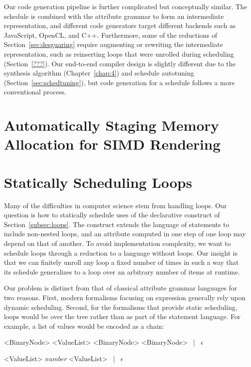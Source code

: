 Our code generation pipeline is further complicated but conceptually similar. The schedule is combined with the attribute grammar to form an intermediate representation, and different code generators target different backends such as JavaScript, OpenCL, and C++. Furthermore, some of the reductions of Section~\ref{sec:desguaring} require augmenting or rewriting the intermediate representation, such as reinserting loops that were unrolled during scheduling (Section~\ref{???}). Our end-to-end compiler design is slightly different due to the synthesis algorithm (Chapter~\ref{chap:4})  and schedule autotuning (Section~\ref{sec:schedtuning}), but code generation for a schedule follows a more conventional process.


\section{Automatically Staging Memory Allocation for SIMD Rendering}




\section{Statically Scheduling Loops}
\label{sec:loopscheduling}
Many of the difficulties in computer science stem from handling loops.  Our question is how to statically schedule uses of the declarative construct of Section~\ref{subsec:loops}. The construct extends the language of statements to include non-nested loops, and an attribute computed in one step of one loop may depend on that of another. To avoid implementation complexity, we want to schedule loops through a reduction to a language without loops. Our insight is that we can finitely unroll any loop a fixed number of times in such a way that its schedule generalizes to a loop over an arbitrary number of items at runtime.
 
Our problem is distinct from that of classical attribute grammar languages for two reasons. First, modern formalisms focusing on expression generally rely upon dynamic scheduling. Second, for the formalisms that provide static scheduling, loops would be over the tree rather than as part of the statement language. For example, a list of values would be encoded as a chain:


\begin{minipage}{1\columnwidth}
\renewcommand{\litleft}{\bfseries}
\renewcommand{\ulitleft}{\bfseries}
\renewcommand{\superscript}[1]{\ensuremath{^{\textrm{#1}}}}
\renewcommand{\subscript}[1]{\ensuremath{_{\textrm{\uppercase{#1}}}}}
\renewcommand{\syntleft}{\normalfont\itshape\texttt{<}}
\renewcommand{\syntright}{\texttt{>}}
\begin{grammar}
<BinaryNode> \deriv{} <ValueList> <BinaryNode> <BinaryNode> ~|~ $\epsilon$

<ValueList> \deriv{} \emph{number} <ValueList>  ~|~ $\epsilon$
\end{grammar}
\end{minipage}



